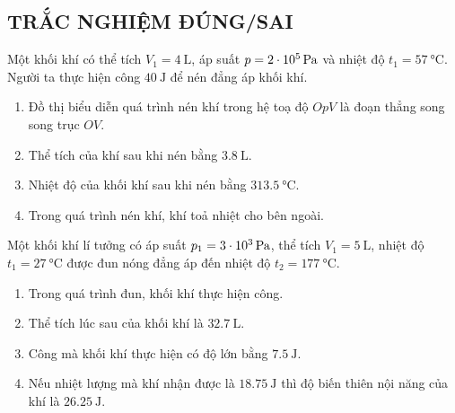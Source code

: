 \subsection{TRẮC NGHIỆM ĐÚNG/SAI}
\setcounter{ex}{0}
\begin{ex}
	Một khối khí có thể tích $V_1=\SI{4}{\liter}$, áp suất $p=\SI{2E5}{\pascal}$ và nhiệt độ $t_1=\SI{57}{\celsius}$. Người ta thực hiện công $\SI{40}{\joule}$ để nén đẳng áp khối khí.
	\begin{enumerate}[label=\alph*)]
		\item Đồ thị biểu diễn quá trình nén khí trong hệ toạ độ $OpV$ là đoạn thẳng song song trục $OV$.
		\item Thể tích của khí sau khi nén bằng $\SI{3.8}{\liter}$.
		\item Nhiệt độ của khối khí sau khi nén bằng $\SI{313.5}{\celsius}$.
		\item Trong quá trình nén khí, khí toả nhiệt cho bên ngoài.
	\end{enumerate}
\end{ex}
\begin{ex}
	Một khối khí lí tưởng có áp suất $p_1=\SI{3E3}{\pascal}$, thể tích $V_1=\SI{5}{\liter}$, nhiệt độ $t_1=\SI{27}{\celsius}$ được đun nóng đẳng áp đến nhiệt độ $t_2=\SI{177}{\celsius}$.
	\begin{enumerate}[label=\alph*)]
		\item Trong quá trình đun, khối khí thực hiện công.
		\item Thể tích lúc sau của khối khí là $\SI{32.7}{\liter}$.
		\item Công mà khối khí thực hiện có độ lớn bằng $\SI{7.5}{\joule}$.
		\item Nếu nhiệt lượng mà khí nhận được là $\SI{18.75}{\joule}$ thì độ biến thiên nội năng của khí là $\SI{26.25}{\joule}$. 
	\end{enumerate}
	
\end{ex}
